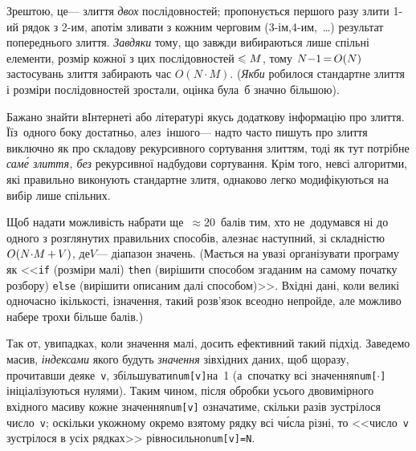 Зрештою, це\nolinebreak[3] --- злиття \emph{двох} послідовностей; пропонується першого разу злити \mbox{1-ий} рядок з \mbox{2-им}, а\nolinebreak[3] потім зливати з кожним черговим (\mbox{3-ім},\nolinebreak[2] \mbox{4-им},~\dots) результат попереднього злиття. \emph{Завдяки} тому, що завжди вибираються лише спільні елементи, розмір кожної з цих послідовностей${}\leqslant M$, тому ${N{-}1}\dib{{=}}O(N)$ застосувань злиття забирають час $O(N{\cdot}M)$. (\emph{Якби} робилося стандартне злиття і розміри послідовностей зростали, оцінка була~б значно більшою).

Бажано знайти в\nolinebreak[3] Інтернеті або літературі якусь додаткову інформацію про злиття. Її\nolinebreak[2] з~одного боку достатньо, але\nolinebreak[2] з~іншого\nolinebreak[3] --- надто часто пишуть про злиття виключно як про складову рекурсивного сортування злиттям, тоді як тут потрібне \emph{сам\'{е} злиття, без} рекурсивної надбудови сортування. Крім того, не\nolinebreak[3] всі алгоритми, які правильно виконують стандартне злитя, однаково легко модифікуються на вибір лише спільних.

Щоб надати можливість набрати ще~${\approx}20$~балів тим, хто не~додумався ні до одного з розглянутих правильних способів, але\nolinebreak[3] знає наступний, зі складністю $O(N{\cdot}M\dib{{+}}V)$, де\nolinebreak[3] $V$\nolinebreak[3] --- діапазон значень. (Мається на увазі організувати програму як <<\texttt{if} (розміри малі) \texttt{then} (вирішити способом згаданим на самому початку розбору) \texttt{else} (вирішити описаним далі способом)>>. Вхідні дані, коли великі одночасно і\nolinebreak[3] кількості, і\nolinebreak[3] значення, такий розв'язок все\nolinebreak[3] одно не\nolinebreak[3] пройде, але можливо набере трохи більше балів.)

Так от, у\nolinebreak[3] випадках, коли значення малі, досить ефективний такий підхід. Заведемо масив, \emph{індексами} якого будуть \emph{значення} зі\nolinebreak[3] вхідних даних, щоб щоразу, прочитавши деяке~\texttt{v}, збільшувати\nolinebreak[2] \texttt{num[v]}\nolinebreak[2] на~1 (а~спочатку всі значення\nolinebreak[3] \texttt{num[$\cdot$]} ініціалізуються нулями). Таким чином, після обробки усього двовимірного вхідного масиву кожне значення\nolinebreak[2] \texttt{num[v]} означатиме, скільки разів зустрілося число~\texttt{v}; оскільки у\nolinebreak[3] кожному окремо взятому рядку всі ч\'{и}сла різні, то <<число~\texttt{v} зустрілося в усіх рядках>> рівносильно\nolinebreak[1] \mbox{\texttt{num[v]=N}}.

